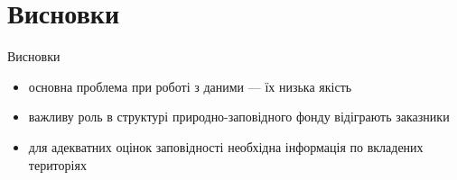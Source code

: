 \documentclass[12pt, aspectratio=1610]{beamer}
\begin{document}
\section{Висновки}
\begin{frame}{Висновки}{}
  \begin{itemize}
    \item основна проблема при роботі з даними --- їх низька якість
    \item важливу роль в структурі природно-заповідного фонду відіграють заказники
    \item для адекватних оцінок заповідності необхідна інформація по вкладених територіях
  \end{itemize}
\end{frame}


{%
\begin{frame}%
\end{frame}}
\end{document}
